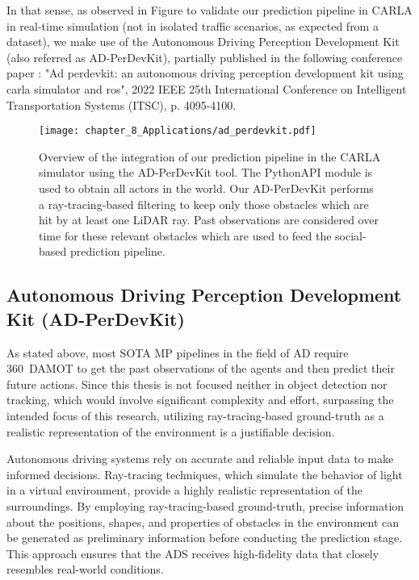 In that sense, as observed in Figure to validate our prediction pipeline in CARLA in real-time simulation (not in isolated traffic scenarios, as expected from a dataset), we make use of the Autonomous Driving Perception Development Kit (also referred as AD-PerDevKit), partially published in the following conference paper \cite{de2022ad}: "Ad perdevkit: an autonomous driving perception development kit using carla simulator and ros", 2022 IEEE 25th International Conference on Intelligent Transportation Systems (ITSC), p. 4095-4100.  

\begin{figure}[h]
	\centering
	\texttt{[image: chapter\_8\_Applications/ad\_perdevkit.pdf]}
	\captionsetup{justification=justified}
	\caption[Overview of the integration of our prediction pipeline in the CARLA simulator using the AD-PerDevKit tool]{Overview of the integration of our prediction pipeline in the CARLA simulator using the AD-PerDevKit tool. The PythonAPI module is used to obtain all actors in the world. Our AD-PerDevKit performs a ray-tracing-based filtering to keep only those obstacles which are hit by at least one LiDAR ray. Past observations are considered over time for these relevant obstacles which are used to feed the social-based prediction pipeline.}
	\label{fig:chapter_8_Applications/ad_perdevkit}
\end{figure}

\subsection{Autonomous Driving Perception Development Kit (AD-PerDevKit)}
\label{subsec:8_ad_perdevkit}

As stated above, most \ac{SOTA} \ac{MP} pipelines in the field of \ac{AD} require 360\degree~\ac{DAMOT} to get the past observations of the agents and then predict their future actions. Since this thesis is not focused neither in object detection nor tracking, which would involve significant complexity and effort, surpassing the intended focus of this research, utilizing ray-tracing-based ground-truth as a realistic representation of the environment is a justifiable decision.

Autonomous driving systems rely on accurate and reliable input data to make informed decisions. Ray-tracing techniques, which simulate the behavior of light in a virtual environment, provide a highly realistic representation of the surroundings. By employing ray-tracing-based ground-truth, precise information about the positions, shapes, and properties of obstacles in the environment can be generated as preliminary information before conducting the prediction stage. This approach ensures that the \ac{ADS} receives high-fidelity data that closely resembles real-world conditions. 

